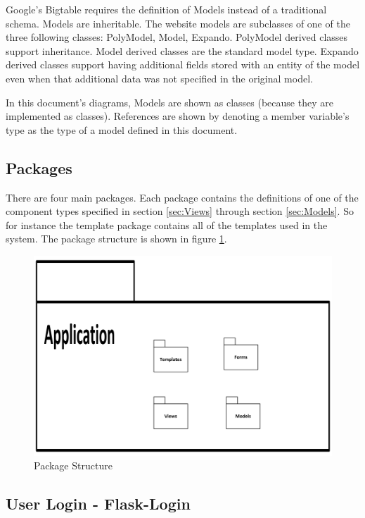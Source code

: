 \documentclass{article}
\begin{document}
Google's Bigtable requires the definition of Models instead of a traditional schema. Models are inheritable. The website models are subclasses of one of the three following classes: PolyModel, Model, Expando. PolyModel derived classes support inheritance. Model derived classes are the standard model type. Expando derived classes support having additional fields stored with an entity of the model even when that additional data was not specified in the original model.

In this document's diagrams, Models are shown as classes (because they are implemented as classes). References are shown by denoting a member variable's type as the type of a model defined in this document.

\subsection{Packages}

There are four main packages. Each package contains the definitions of one of the component types specified in section \ref{sec:Views} through section \ref{sec:Models}. So for instance the template package contains all of the templates used in the system. The package structure is shown in figure \ref{fig:PackageStructure}.

\FloatBarrier
\begin{figure}[h1]
\centering
\includegraphics[scale=.75]{img/applicationStructure}
\caption{Package Structure}
\label{fig:PackageStructure}
\end{figure}
\FloatBarrier

\subsection{User Login - Flask-Login}
\end{document}
